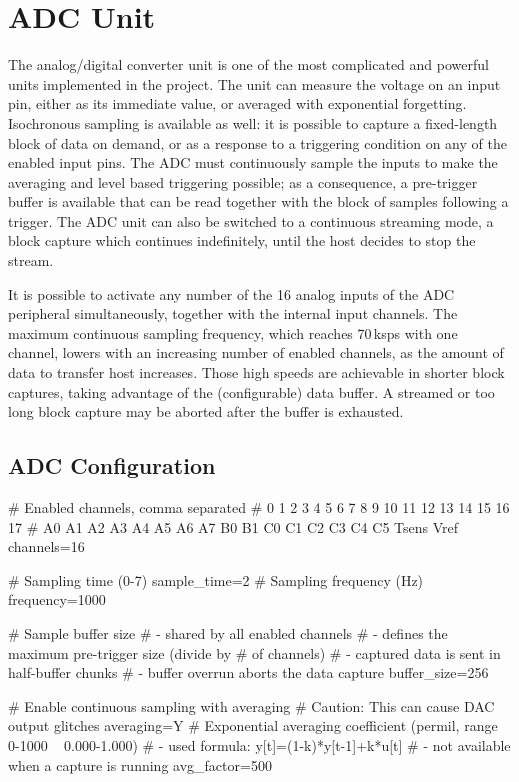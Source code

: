 \section{ADC Unit}

The analog/digital converter unit is one of the most complicated and powerful units implemented in the project. The unit can measure the voltage on an input pin, either as its immediate value, or averaged with exponential forgetting. Isochronous sampling is available as well: it is possible to capture a fixed-length block of data on demand, or as a response to a triggering condition on any of the enabled input pins. The \gls{ADC} must continuously sample the inputs to make the averaging and level based triggering possible; as a consequence, a pre-trigger buffer is available that can be read together with the block of samples following a trigger. The \gls{ADC} unit can also be switched to a continuous streaming mode, a block capture which continues indefinitely, until the host decides to stop the stream.

It is possible to activate any number of the 16 analog inputs of the \gls{ADC} peripheral simultaneously, together with the internal input channels. The maximum continuous sampling frequency, which reaches 70\,ksps with one channel, lowers with an increasing number of enabled channels, as the amount of data to transfer host increases. Those high speeds are achievable in shorter block captures, taking advantage of the (configurable) data buffer. A streamed or too long block capture may be aborted after the buffer is exhausted.


\subsection{ADC Configuration}

\begin{inicode}
# Enabled channels, comma separated
#  0  1  2  3  4  5  6  7    8  9   10 11 12 13 14 15   16    17
# A0 A1 A2 A3 A4 A5 A6 A7   B0 B1   C0 C1 C2 C3 C4 C5   Tsens Vref
channels=16

# Sampling time (0-7)
sample_time=2
# Sampling frequency (Hz)
frequency=1000

# Sample buffer size
# - shared by all enabled channels
# - defines the maximum pre-trigger size (divide by # of channels)
# - captured data is sent in half-buffer chunks
# - buffer overrun aborts the data capture
buffer_size=256

# Enable continuous sampling with averaging
# Caution: This can cause DAC output glitches
averaging=Y
# Exponential averaging coefficient (permil, range 0-1000 ~ 0.000-1.000)
# - used formula: y[t]=(1-k)*y[t-1]+k*u[t]
# - not available when a capture is running
avg_factor=500
\end{inicode}

